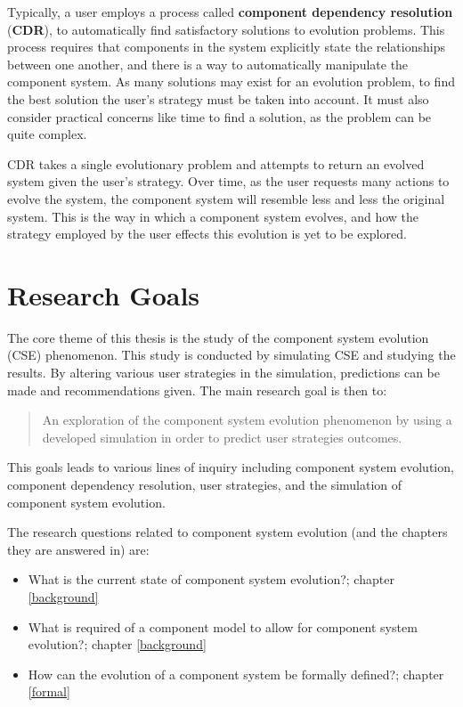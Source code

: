 Typically, a user employs a process called \textbf{component dependency resolution} (\textbf{CDR}), to automatically find satisfactory solutions to evolution problems.
This process requires that components in the system explicitly state the relationships between one another, and there is a way to automatically manipulate the component system.
As many solutions may exist for an evolution problem, to find the best solution the user's strategy must be taken into account.
It must also consider practical concerns like time to find a solution, as the problem can be quite complex.

CDR takes a single evolutionary problem and attempts to return an evolved system given the user's strategy.
Over time, as the user requests many actions to evolve the system, the component system will resemble less and less the original system.
This is the way in which a component system evolves, and how the strategy employed by the user effects this evolution is yet to be explored. 

\section{Research Goals}
The core theme of this thesis is the study of the component system evolution (CSE) phenomenon.
This study is conducted by simulating CSE and studying the results. 
By altering various user strategies in the simulation, predictions can be made and recommendations given.
The main research goal is then to:
\begin{quote}
An exploration of the component system evolution phenomenon by using a developed simulation in order to predict user strategies outcomes.
\end{quote}

This goals leads to various lines of inquiry including component system evolution, component dependency resolution, user strategies, and the simulation of component system evolution.

The research questions related to component system evolution (and the chapters they are answered in) are:
\begin{itemize}
	\item What is the current state of component system evolution?; chapter \ref{background}
	\item What is required of a component model to allow for component system evolution?; chapter \ref{background}
	\item How can the evolution of a component system be formally defined?; chapter \ref{formal}
\end{itemize}

